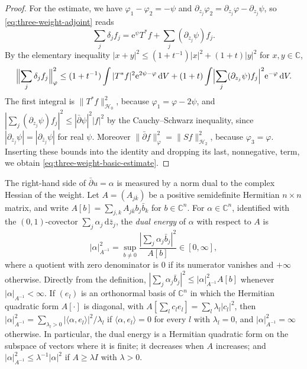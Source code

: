 \begin{proof}
For the estimate, we have $\varphi_1-\varphi_2=-\psi$ and $\partial_{z_j}\varphi_2=\partial_{z_j}\varphi-\partial_{z_j}\psi$, so \eqref{eq:three-weight-adjoint} reads
\[
 \sum_j\delta_jf_j=\mathrm e^\psi T^*f+\sum_j(\partial_{z_j}\psi)f_j.
\]
By the elementary inequality $|x+y|^2\le(1+t^{-1})|x|^2+(1+t)|y|^2$ for $x,y\in\mathbb C$,
\[
 \Bigl\|\sum_j\delta_jf_j\Bigr\|_\varphi^2\le(1+t^{-1})\int|T^*f|^2\mathrm e^{2\psi-\varphi}\,\mathrm dV+(1+t)\int\Bigl|\sum_j(\partial_{z_j}\psi)f_j\Bigr|^2\mathrm e^{-\varphi}\,\mathrm dV.
\]
The first integral is $\|T^*f\|_{\mathcal H_0}^2$, because $\varphi_1=\varphi-2\psi$, and $|\sum_j(\partial_{z_j}\psi)f_j|^2\le|\bar\partial\psi|^2|f|^2$ by the Cauchy--Schwarz inequality, since $|\partial_{z_j}\psi|=|\partial_{\bar z_j}\psi|$ for real $\psi$. Moreover $\|\bar\partial f\|_\varphi^2=\|Sf\|_{\mathcal H_2}^2$, because $\varphi_3=\varphi$. Inserting these bounds into the identity and dropping its last, nonnegative, term, we obtain \eqref{eq:three-weight-basic-estimate}.
\end{proof}

The right-hand side of $\bar\partial u=\alpha$ is measured by a norm dual to the complex Hessian of the weight. Let $A=(A_{j\bar k})$ be a positive semidefinite Hermitian $n\times n$ matrix, and write $A[b]=\sum_{j,k}A_{j\bar k}b_j\bar b_k$ for $b\in\mathbb C^n$. For $\alpha\in\mathbb C^n$, identified with the $(0,1)$-covector $\sum_j\alpha_j\,\mathrm d\bar z_j$, the \emph{dual energy} of $\alpha$ with respect to $A$ is
\[
 |\alpha|_{A^{-1}}^2
   =\sup_{b\ne0}\frac{|\sum_j\alpha_j\bar b_j|^2}{A[b]}\in[0,\infty],
\]
where a quotient with zero denominator is $0$ if its numerator vanishes and $+\infty$ otherwise. Directly from the definition, $|\sum_j\alpha_j\bar b_j|^2\le|\alpha|_{A^{-1}}^2A[b]$ whenever $|\alpha|_{A^{-1}}<\infty$. If $(e_l)$ is an orthonormal basis of $\mathbb C^n$ in which the Hermitian quadratic form $A[\cdot]$ is diagonal, with $A[\sum_lc_le_l]=\sum_l\lambda_l|c_l|^2$, then $|\alpha|_{A^{-1}}^2=\sum_{\lambda_l>0}|\langle\alpha,e_l\rangle|^2/\lambda_l$ if $\langle\alpha,e_l\rangle=0$ for every $l$ with $\lambda_l=0$, and $|\alpha|_{A^{-1}}^2=\infty$ otherwise. In particular, the dual energy is a Hermitian quadratic form on the subspace of vectors where it is finite; it decreases when $A$ increases; and $|\alpha|_{A^{-1}}^2\le\lambda^{-1}|\alpha|^2$ if $A\ge\lambda I$ with $\lambda>0$.

